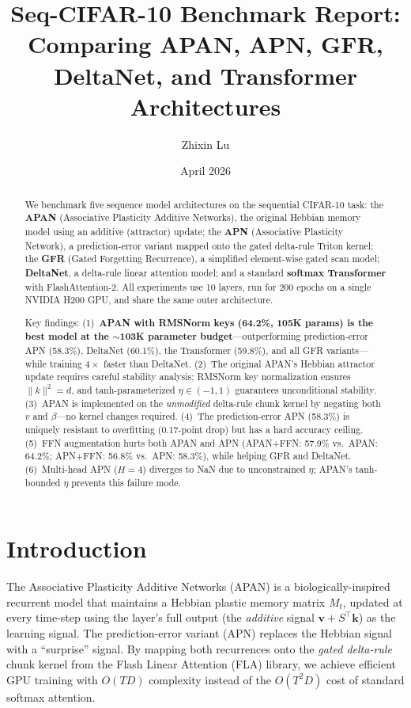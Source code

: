 \documentclass[11pt,a4paper]{article}
\title{Seq-CIFAR-10 Benchmark Report:\\
Comparing APAN, APN, GFR, DeltaNet, and Transformer Architectures}
\author{Zhixin Lu}
\date{April 2026}
\begin{document}
\maketitle

\begin{abstract}
We benchmark five sequence model architectures on the sequential CIFAR-10 task:
the \textbf{APAN} (Associative Plasticity Additive Networks), the original Hebbian memory model using an additive (attractor) update;
the \textbf{APN} (Associative Plasticity Network), a prediction-error variant mapped onto the gated delta-rule Triton kernel;
the \textbf{GFR} (Gated Forgetting Recurrence), a simplified element-wise gated scan model;
\textbf{DeltaNet}, a delta-rule linear attention model; and a standard \textbf{softmax Transformer} with FlashAttention-2.
All experiments use 10 layers, run for 200 epochs on a single NVIDIA H200 GPU, and share the same outer architecture.

Key findings:
(1)~\textbf{APAN with RMSNorm keys (64.2\%, 105K params) is the best model at the $\sim$103K parameter budget}---outperforming prediction-error APN (58.3\%), DeltaNet (60.1\%), the Transformer (59.8\%), and all GFR variants---while training $4\times$ faster than DeltaNet.
(2)~The original APAN's Hebbian attractor update requires careful stability analysis; RMSNorm key normalization ensures $\|k\|^2 = d$, and tanh-parameterized $\eta \in (-1,1)$ guarantees unconditional stability.
(3)~APAN is implemented on the \emph{unmodified} delta-rule chunk kernel by negating both $v$ and $\beta$---no kernel changes required.
(4)~The prediction-error APN (58.3\%) is uniquely resistant to overfitting (0.17-point drop) but has a hard accuracy ceiling.
(5)~FFN augmentation hurts both APAN and APN (APAN+FFN: 57.9\% vs.\ APAN: 64.2\%; APN+FFN: 56.8\% vs.\ APN: 58.3\%), while helping GFR and DeltaNet.
(6)~Multi-head APN ($H{=}4$) diverges to NaN due to unconstrained $\eta$; APAN's tanh-bounded $\eta$ prevents this failure mode.
\end{abstract}

\section{Introduction}

The Associative Plasticity Additive Networks (APAN) is a biologically-inspired recurrent model that maintains a Hebbian plastic memory matrix $M_t$, updated at every time-step using the layer's full output (the \emph{additive} signal $\mathbf{v} + S^\top\mathbf{k}$) as the learning signal.
The prediction-error variant (APN) replaces the Hebbian signal with a ``surprise'' signal.
By mapping both recurrences onto the \emph{gated delta-rule} chunk kernel from the Flash Linear Attention (FLA) library, we achieve efficient GPU training with $O(TD)$ complexity instead of the $O(T^2 D)$ cost of standard softmax attention.
\end{document}
